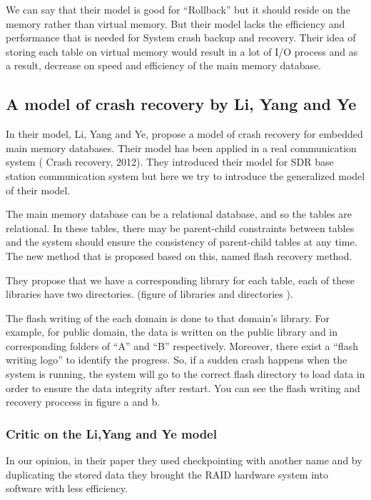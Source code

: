 \documentclass[12pt]{article} %
\begin{document}
We can say that their model is good for ``Rollback'' but it should reside on the memory rather than virtual memory. But their model lacks the efficiency and performance that is needed for System crash backup and recovery. Their idea of storing each table on virtual memory would result in a lot of I/O process and as a result, decrease on speed and efficiency of the main memory database.

\subsection{A model of crash recovery by Li, Yang and Ye}

In their model, Li, Yang and Ye, propose a model of crash recovery for embedded main memory databases.  Their model has been applied in a real communication system ( Crash recovery, 2012). They introduced their model for SDR base station communication system but here we try to introduce the generalized model of their model.

The main memory database can be a relational database, and so the tables are relational. In these tables, there may be parent-child constraints between tables and the system should ensure the consistency of parent-child tables at any time. The new method that is proposed based on this, named flash recovery method.

They propose that we have a corresponding library for each table, each of these libraries have two directories. (figure of libraries and directories ).

The flash writing of the each domain is done to that domain’s library. For example, for  public domain, the data is written on the public library and in corresponding folders of “A” and “B” respectively. Moreover, there exist a “flash writing logo” to identify the progress. So, if a sudden crash happens when the system is running, the system will go to the correct flash directory to load data in order to ensure the data integrity after restart. You can see the flash writing and recovery proccess in figure a and b.

\subsubsection{Critic on the Li,Yang and Ye model}

In our opinion, in their paper they used checkpointing with another name and by duplicating the stored data they brought the RAID hardware system into software with less efficiency.
\end{document}
